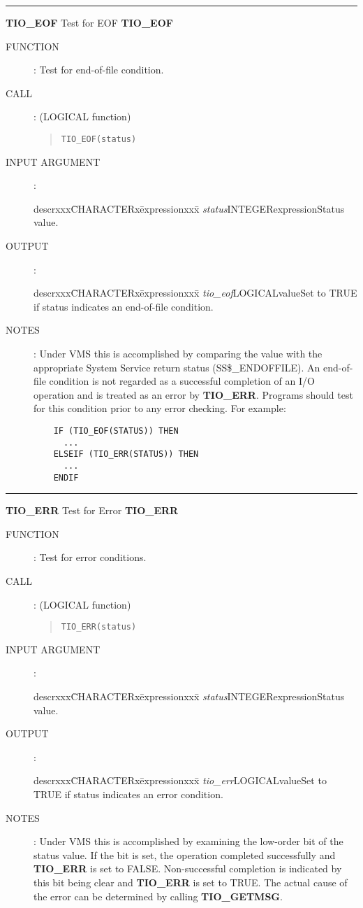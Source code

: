 \goodbreak
\rule{\textwidth}{0.3mm}
{\Large {\bf TIO\_EOF} \hfill Test for EOF \hfill {\bf TIO\_EOF}}
\begin{description}
\item [FUNCTION]:
Test for end-of-file condition.
\item [CALL]: (LOGICAL function)
\begin{quote}
{\tt TIO\_EOF(status)}
\end{quote}
\item [INPUT ARGUMENT]:
\begin{tabbing}
descrxxx\=CHARACTERx\=expressionxxx\=\kill
{\em status}\>INTEGER\>expression\>Status value.
\end{tabbing}
\item [OUTPUT]:
\begin{tabbing}
descrxxx\=CHARACTERx\=expressionxxx\=\kill
{\em tio\_eof}\>LOGICAL\>value\>Set to TRUE if status indicates an end-of-file condition.
\end{tabbing}
\item [NOTES]:
Under VMS this is accomplished by comparing the value with the appropriate
System Service return status (SS\$\_ENDOFFILE).
An end-of-file condition is not regarded as a successful completion of an I/O
operation and is treated as an error by {\bf TIO\_ERR}.
Programs should test for this condition prior to any error checking.
For example:
\begin{verbatim}
    IF (TIO_EOF(STATUS)) THEN
      ...
    ELSEIF (TIO_ERR(STATUS)) THEN
      ...
    ENDIF
\end{verbatim}
\end{description}
\goodbreak
\rule{\textwidth}{0.3mm}
{\Large {\bf TIO\_ERR} \hfill Test for Error \hfill {\bf TIO\_ERR}}
\begin{description}
\item [FUNCTION]:
Test for error conditions.
\item [CALL]: (LOGICAL function)
\begin{quote}
{\tt TIO\_ERR(status)}
\end{quote}
\item [INPUT ARGUMENT]:
\begin{tabbing}
descrxxx\=CHARACTERx\=expressionxxx\=\kill
{\em status}\>INTEGER\>expression\>Status value.
\end{tabbing}
\item [OUTPUT]:
\begin{tabbing}
descrxxx\=CHARACTERx\=expressionxxx\=\kill
{\em tio\_err}\>LOGICAL\>value\>Set to TRUE if status indicates an error condition.
\end{tabbing}
\item [NOTES]:
Under VMS this is accomplished by examining the low-order bit of the status
value.
If the bit is set, the operation completed successfully and {\bf TIO\_ERR} is
set to FALSE.
Non-successful completion is indicated by this bit being clear and
{\bf TIO\_ERR} is set to TRUE.
The actual cause of the error can be determined by calling {\bf TIO\_GETMSG}.
\end{description}
